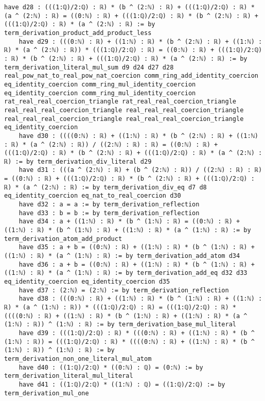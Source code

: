 \documentclass{article}
\begin{document}
\begin{tcolorbox}[colback=white!10, width=\linewidth]
\begin{lstlisting}[language=Lean4]
    have d28 : (((1:ℚ)/2:ℚ) : ℝ) * (b ^ (2:ℕ) : ℝ) + (((1:ℚ)/2:ℚ) : ℝ) * (a ^ (2:ℕ) : ℝ) = ((0:ℕ) : ℝ) + (((1:ℚ)/2:ℚ) : ℝ) * (b ^ (2:ℕ) : ℝ) + (((1:ℚ)/2:ℚ) : ℝ) * (a ^ (2:ℕ) : ℝ) := by term_derivation_product_add_product_less
    have d29 : (((0:ℕ) : ℝ) + ((1:ℕ) : ℝ) * (b ^ (2:ℕ) : ℝ) + ((1:ℕ) : ℝ) * (a ^ (2:ℕ) : ℝ)) * (((1:ℚ)/2:ℚ) : ℝ) = ((0:ℕ) : ℝ) + (((1:ℚ)/2:ℚ) : ℝ) * (b ^ (2:ℕ) : ℝ) + (((1:ℚ)/2:ℚ) : ℝ) * (a ^ (2:ℕ) : ℝ) := by term_derivation_literal_mul_sum d9 d24 d27 d28 real_pow_nat_to_real_pow_nat_coercion comm_ring_add_identity_coercion eq_identity_coercion comm_ring_mul_identity_coercion eq_identity_coercion comm_ring_mul_identity_coercion rat_real_real_coercion_triangle rat_real_real_coercion_triangle real_real_real_coercion_triangle real_real_real_coercion_triangle real_real_real_coercion_triangle real_real_real_coercion_triangle eq_identity_coercion
    have d30 : ((((0:ℕ) : ℝ) + ((1:ℕ) : ℝ) * (b ^ (2:ℕ) : ℝ) + ((1:ℕ) : ℝ) * (a ^ (2:ℕ) : ℝ)) / ((2:ℕ) : ℝ) : ℝ) = ((0:ℕ) : ℝ) + (((1:ℚ)/2:ℚ) : ℝ) * (b ^ (2:ℕ) : ℝ) + (((1:ℚ)/2:ℚ) : ℝ) * (a ^ (2:ℕ) : ℝ) := by term_derivation_div_literal d29
    have d31 : (((a ^ (2:ℕ) : ℝ) + (b ^ (2:ℕ) : ℝ)) / ((2:ℕ) : ℝ) : ℝ) = ((0:ℕ) : ℝ) + (((1:ℚ)/2:ℚ) : ℝ) * (b ^ (2:ℕ) : ℝ) + (((1:ℚ)/2:ℚ) : ℝ) * (a ^ (2:ℕ) : ℝ) := by term_derivation_div_eq d7 d8 eq_identity_coercion eq_nat_to_real_coercion d30
    have d32 : a = a := by term_derivation_reflection
    have d33 : b = b := by term_derivation_reflection
    have d34 : a + ((1:ℕ) : ℝ) * (b ^ (1:ℕ) : ℝ) = ((0:ℕ) : ℝ) + ((1:ℕ) : ℝ) * (b ^ (1:ℕ) : ℝ) + ((1:ℕ) : ℝ) * (a ^ (1:ℕ) : ℝ) := by term_derivation_atom_add_product
    have d35 : a + b = ((0:ℕ) : ℝ) + ((1:ℕ) : ℝ) * (b ^ (1:ℕ) : ℝ) + ((1:ℕ) : ℝ) * (a ^ (1:ℕ) : ℝ) := by term_derivation_add_atom d34
    have d36 : a + b = ((0:ℕ) : ℝ) + ((1:ℕ) : ℝ) * (b ^ (1:ℕ) : ℝ) + ((1:ℕ) : ℝ) * (a ^ (1:ℕ) : ℝ) := by term_derivation_add_eq d32 d33 eq_identity_coercion eq_identity_coercion d35
    have d37 : (2:ℕ) = (2:ℕ) := by term_derivation_reflection
    have d38 : (((0:ℕ) : ℝ) + ((1:ℕ) : ℝ) * (b ^ (1:ℕ) : ℝ) + ((1:ℕ) : ℝ) * (a ^ (1:ℕ) : ℝ)) * (((1:ℚ)/2:ℚ) : ℝ) = (((1:ℚ)/2:ℚ) : ℝ) * ((((0:ℕ) : ℝ) + ((1:ℕ) : ℝ) * (b ^ (1:ℕ) : ℝ) + ((1:ℕ) : ℝ) * (a ^ (1:ℕ) : ℝ)) ^ (1:ℕ) : ℝ) := by term_derivation_base_mul_literal
    have d39 : (((1:ℚ)/2:ℚ) : ℝ) * (((0:ℕ) : ℝ) + ((1:ℕ) : ℝ) * (b ^ (1:ℕ) : ℝ)) = (((1:ℚ)/2:ℚ) : ℝ) * ((((0:ℕ) : ℝ) + ((1:ℕ) : ℝ) * (b ^ (1:ℕ) : ℝ)) ^ (1:ℕ) : ℝ) := by term_derivation_non_one_literal_mul_atom
    have d40 : ((1:ℚ)/2:ℚ) * ((0:ℕ) : ℚ) = (0:ℕ) := by term_derivation_literal_mul_literal
    have d41 : ((1:ℚ)/2:ℚ) * ((1:ℕ) : ℚ) = ((1:ℚ)/2:ℚ) := by term_derivation_mul_one

\end{lstlisting}
\end{tcolorbox}
\end{document}
